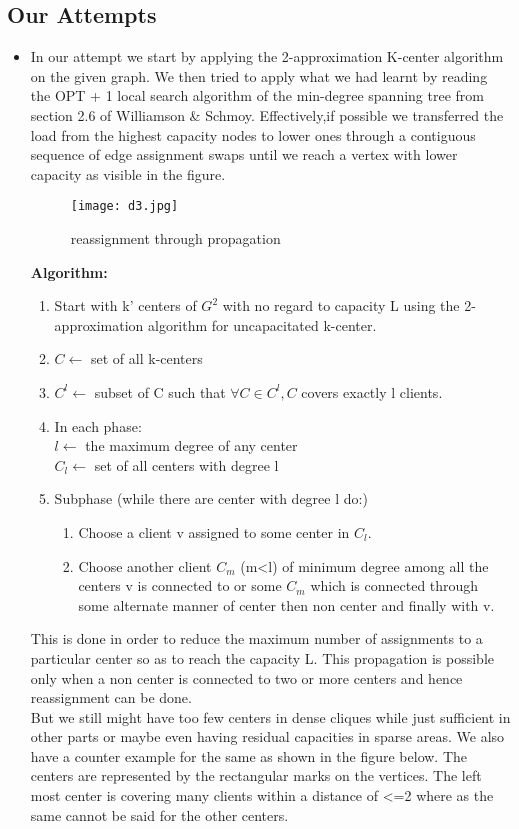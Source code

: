 \documentclass[12pt,a4paper,onecolumn]{article}
\begin{document}
\subsection{Our Attempts}
\begin{itemize}
\item In our attempt we start by applying the 2-approximation K-center algorithm on the given graph. We then tried to apply what we had learnt by reading the OPT + 1 local search algorithm of the min-degree spanning tree from section 2.6 of Williamson \& Schmoy. Effectively,if possible we transferred the load from the highest capacity nodes to lower ones through a contiguous sequence of edge assignment swaps until we reach a vertex with lower capacity as visible in the figure. \\
\begin{figure}[H]
\begin{center}
\texttt{[image: d3.jpg]}
  \caption{reassignment through propagation}
  \label{Figure 13}
\end{center}
\end{figure}
\textbf{Algorithm:}
\begin{enumerate}
\item Start with k' centers of $G^2$ with no regard to capacity L using the 2-approximation algorithm for uncapacitated k-center.
\item $C \leftarrow$ set of all k-centers
\item $C^l \leftarrow$ subset of C such that $\forall C \in C^l, C$ covers exactly l clients.
\item In each phase:\\
\hspace{1cm}$l \leftarrow$ the maximum degree of any center\\
\hspace{1cm}$C_l \leftarrow$ set of all centers with degree l
\item Subphase (while there are center with degree l do:)
\begin{enumerate}
\item Choose a client v assigned to some center in $C_l$.
\item Choose another client $C_m$ (m<l) of minimum degree among all the centers v is connected to or some $C_m$ which is connected through some alternate manner of center then non center and finally with v.
\end{enumerate}
\end{enumerate}
This is done in order to reduce the maximum number of assignments to a particular center so as to reach the capacity L. This propagation is possible only when a non center is connected to two or more centers and hence reassignment can be done.\\ But we still might have too few centers in dense cliques while just sufficient in other parts or maybe even having residual capacities in sparse areas. We also have a counter example for the same as shown in the figure below. The centers are represented by the rectangular marks on the vertices. The left most center is covering many clients within a distance of <=2 where as the same cannot be said for the other centers.\\

\end{itemize}
\end{document}
